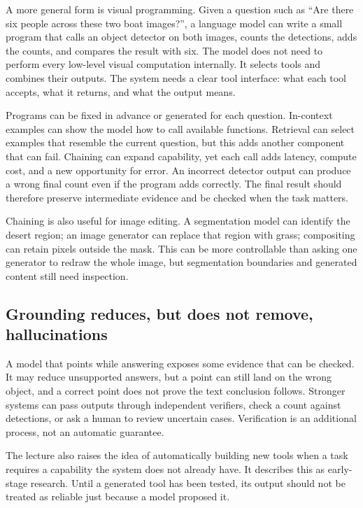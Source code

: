 A more general form is visual programming. Given a question such as ``Are there six people across these two boat images?'', a language model can write a small program that calls an object detector on both images, counts the detections, adds the counts, and compares the result with six. The model does not need to perform every low-level visual computation internally. It selects tools and combines their outputs. The system needs a clear tool interface: what each tool accepts, what it returns, and what the output means.

Programs can be fixed in advance or generated for each question. In-context examples can show the model how to call available functions. Retrieval can select examples that resemble the current question, but this adds another component that can fail. Chaining can expand capability, yet each call adds latency, compute cost, and a new opportunity for error. An incorrect detector output can produce a wrong final count even if the program adds correctly. The final result should therefore preserve intermediate evidence and be checked when the task matters.

Chaining is also useful for image editing. A segmentation model can identify the desert region; an image generator can replace that region with grass; compositing can retain pixels outside the mask. This can be more controllable than asking one generator to redraw the whole image, but segmentation boundaries and generated content still need inspection.

\subsection{Grounding reduces, but does not remove, hallucinations}\label{04-visual-computing-ii-ch031-grounding-reduces-but-does-not-remove-hallucinations}

\hypertarget{04-visual-computing-ii-ch031-grounding-reduces-but-does-not-remove-hallucinations}{}

A model that points while answering exposes some evidence that can be checked. It may reduce unsupported answers, but a point can still land on the wrong object, and a correct point does not prove the text conclusion follows. Stronger systems can pass outputs through independent verifiers, check a count against detections, or ask a human to review uncertain cases. Verification is an additional process, not an automatic guarantee.

The lecture also raises the idea of automatically building new tools when a task requires a capability the system does not already have. It describes this as early-stage research. Until a generated tool has been tested, its output should not be treated as reliable just because a model proposed it.

